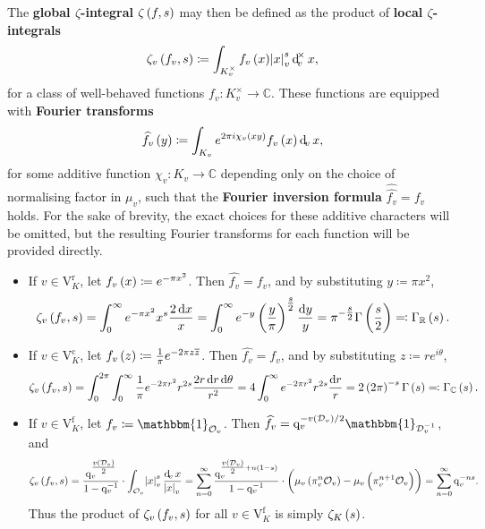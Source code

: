 \documentclass{article}
\newcommand{\1}{\mathbbm{1}}
\newcommand{\br}{\del}
\renewcommand{\c}{\mathrm{c}}
\newcommand{\CC}{\mathbb{C}}
\newcommand{\DDD}{\mathcal{D}}
\newcommand{\f}{\mathrm{f}}
\newcommand{\OOO}{\mathcal{O}}
\newcommand{\q}{\mathrm{q}}
\renewcommand{\r}{\mathrm{r}}
\newcommand{\RR}{\mathbb{R}}
\newcommand{\V}{\mathrm{V}}
\begin{document}
The \textbf{global $ \zeta $-integral} $ \zeta\br{f, s} $ may then be defined as the product of \textbf{local $ \zeta $-integrals}
$$ \zeta_v\br{f_v, s} \coloneqq \int_{K_v^\times} f_v\br{x}\abs{x}_v^s\dif_v^\times x, $$
for a class of well-behaved functions $ f_v : K_v^\times \to \CC $. These functions are equipped with \textbf{Fourier transforms}
$$ \widehat{f_v}\br{y} \coloneqq \int_{K_v} e^{2\pi i\chi_v\br{xy}}f_v\br{x}\dif_v x, $$
for some additive function $ \chi_v : K_v \to \CC $ depending only on the choice of normalising factor in $ \mu_v $, such that the \textbf{Fourier inversion formula} $ \widehat{\widehat{f_v}} = f_v $ holds. For the sake of brevity, the exact choices for these additive characters will be omitted, but the resulting Fourier transforms for each function will be provided directly.
\begin{itemize}
\item If $ v \in \V_K^\r $, let $ f_v\br{x} \coloneqq e^{-\pi x^2} $. Then $ \widehat{f_v} = f_v $, and by substituting $ y \coloneqq \pi x^2 $,
$$ \zeta_v\br{f_v, s} = \int_0^\infty e^{-\pi x^2}x^s\dfrac{2\dif x}{x} = \int_0^\infty e^{-y}\br{\dfrac{y}{\pi}}^{\tfrac{s}{2}}\dfrac{\dif y}{y} = \pi^{-\tfrac{s}{2}}\Gamma\br{\dfrac{s}{2}} \eqqcolon \Gamma_\RR\br{s}. $$
\item If $ v \in \V_K^\c $, let $ f_v\br{z} \coloneqq \tfrac{1}{\pi}e^{-2\pi z\overline{z}} $. Then $ \widehat{f_v} = f_v $, and by substituting $ z \coloneqq re^{i\theta} $,
$$ \zeta_v\br{f_v, s} = \int_0^{2\pi} \int_0^\infty \dfrac{1}{\pi}e^{-2\pi r^2}r^{2s}\dfrac{2r\dif r\dif \theta}{r^2} = 4\int_0^\infty e^{-2\pi r^2}r^{2s}\dfrac{\dif r}{r} = 2\br{2\pi}^{-s}\Gamma\br{s} \eqqcolon \Gamma_\CC\br{s}. $$
\item If $ v \in \V_K^\f $, let $ f_v \coloneqq \1_{\OOO_v} $. Then $ \widehat{f_v} = \q_v^{-v\br{\DDD_v} / 2}\1_{\DDD_v^{-1}} $, and
$$ \zeta_v\br{f_v, s} = \dfrac{\q_v^{\tfrac{v\br{\DDD_v}}{2}}}{1 - \q_v^{-1}} \cdot \int_{\OOO_v} \abs{x}_v^s\dfrac{\dif_v x}{\abs{x}_v} = \sum_{n = 0}^\infty \dfrac{\q_v^{\tfrac{v\br{\DDD_v}}{2} + n\br{1 - s}}}{1 - \q_v^{-1}} \cdot \br{\mu_v\br{\pi_v^n\OOO_v} - \mu_v\br{\pi_v^{n + 1}\OOO_v}} = \sum_{n = 0}^\infty \q_v^{-ns}. $$
Thus the product of $ \zeta_v\br{f_v, s} $ for all $ v \in \V_K^\f $ is simply $ \zeta_K\br{s} $.
\end{itemize}

\pagebreak
\end{document}
